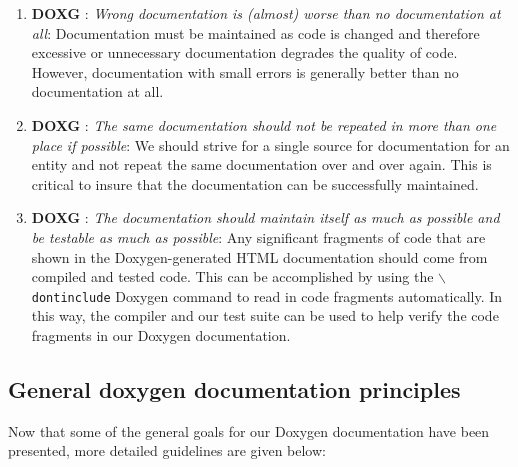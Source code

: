 \begin{enumerate}
{}\item{}\textbf{DOXG }:
{}\textit{Wrong documentation is (almost) worse than no documentation at
all}: Documentation must be maintained as code is changed and therefore
excessive or unnecessary documentation degrades the quality of code.  However,
documentation with small errors is generally better than no documentation at
all.

{}\item{}\textbf{DOXG }:
{}\textit{The same documentation should not be repeated in more than one
place if possible}: We should strive for a single source for documentation for
an entity and not repeat the same documentation over and over again.  This is
critical to insure that the documentation can be successfully maintained.

{}\item{}\textbf{DOXG }:
{}\textit{The documentation should maintain itself as much as possible
and be testable as much as possible}: Any significant fragments of code that
are shown in the Doxygen-generated HTML documentation should come from
compiled and tested code.  This can be accomplished by using the
{}\texttt{$\backslash$dontinclude} Doxygen command to read in code fragments
automatically.  In this way, the compiler and our test suite can be used to
help verify the code fragments in our Doxygen documentation.

\end{enumerate}

%
\subsection{General doxygen documentation principles}
%

Now that some of the general goals for our Doxygen documentation have been
presented, more detailed guidelines are given below:

